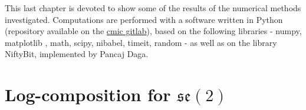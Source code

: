 This last chapter is devoted to show some of the results of the numerical methods investigated.
Computations are performed with a software written in Python (repository available on the \href{https://cmiclab.cs.ucl.ac.uk}{cmic gitlab}), based on 
the following libraries - numpy, matplotlib \cite{hunter2007}, math, scipy, nibabel, timeit, random - as well as on the library NiftyBit, implemented by Pancaj Daga.

\section{Log-composition for $\mathfrak{se}(2)$}

